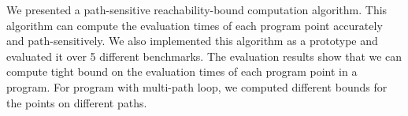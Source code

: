We presented a path-sensitive reachability-bound computation algorithm.
This algorithm can compute the evaluation times of each program point accurately and path-sensitively.
We also implemented this algorithm as a prototype and evaluated it over 5 different benchmarks.
The evaluation results show that we can compute tight bound on the evaluation times of each program point in a program. For program with multi-path loop, we computed different bounds for the points on different paths.